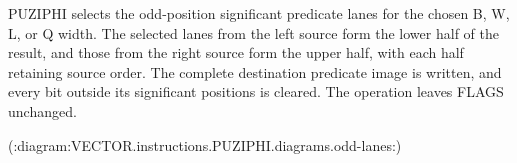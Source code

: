 PUZIPHI selects the odd-position significant predicate lanes for the chosen B, W, L, or Q width.
The selected lanes from the left source form the lower half of the result, and those from the right source form the upper half, with each half retaining source order.
The complete destination predicate image is written, and every bit outside its significant positions is cleared.
The operation leaves FLAGS unchanged.

(:diagram:VECTOR.instructions.PUZIPHI.diagrams.odd-lanes:)
